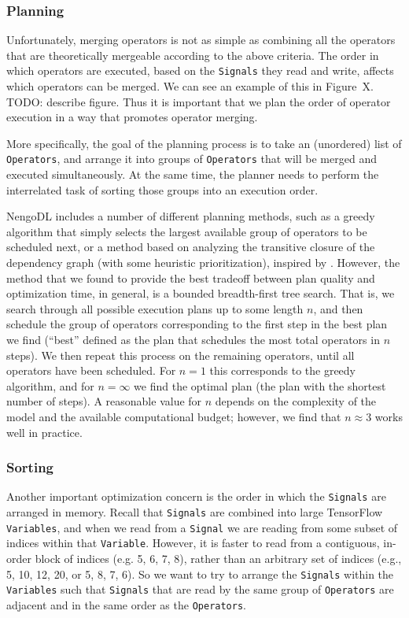 \documentclass{article}
\begin{document}
\subsubsection{Planning}

Unfortunately, merging operators is not as simple as combining all the operators that are theoretically mergeable according to the above criteria.  The order in which operators are executed, based on the \texttt{Signals} they read and write, affects which operators can be merged.  We can see an example of this in Figure~X.  TODO: describe figure.  Thus it is important that we plan the order of operator execution in a way that promotes operator merging.  


More specifically, the goal of the planning process is to take an (unordered) list of \texttt{Operators}, and arrange it into groups of \texttt{Operators} that will be merged and executed simultaneously.  At the same time, the planner needs to perform the interrelated task of sorting those groups into an execution order.

NengoDL includes a number of different planning methods, such as a greedy algorithm that simply selects the largest available group of operators to be scheduled next, or a method based on analyzing the transitive closure of the dependency graph (with some heuristic prioritization), inspired by \citet{needcitation}.  However, the method that we found to provide the best tradeoff between plan quality and optimization time, in general, is a bounded breadth-first tree search.  That is, we search through all possible execution plans up to some length $n$, and then schedule the group of operators corresponding to the first step in the best plan we find (``best'' defined as the plan that schedules the most total operators in $n$ steps).  We then repeat this process on the remaining operators, until all operators have been scheduled.  For $n=1$ this corresponds to the greedy algorithm, and for $n=\infty$ we find the optimal plan (the plan with the shortest number of steps).  A reasonable value for $n$ depends on the complexity of the model and the available computational budget; however, we find that $n \approx 3$ works well in practice.

\subsubsection{Sorting}

Another important optimization concern is the order in which the \texttt{Signals} are arranged in memory.  Recall that \texttt{Signals} are combined into large TensorFlow \texttt{Variables}, and when we read from a \texttt{Signal} we are reading from some subset of indices within that \texttt{Variable}.  However, it is faster to read from a contiguous, in-order block of indices (e.g. 5, 6, 7, 8), rather than an arbitrary set of indices (e.g., 5, 10, 12, 20, or 5, 8, 7, 6).  So we want to try to arrange the \texttt{Signals} within the \texttt{Variables} such that \texttt{Signals} that are read by the same group of \texttt{Operators} are adjacent and in the same order as the \texttt{Operators}.
\end{document}
